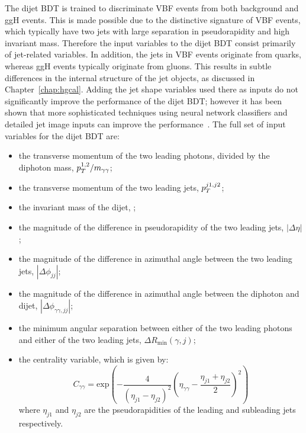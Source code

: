 The dijet BDT is trained to discriminate VBF events from both background and ggH events.
This is made possible due to the distinctive signature of VBF events, 
which typically have two jets with large separation in pseudorapidity and high invariant mass.
Therefore the input variables to the dijet BDT consist primarily of jet-related variables.
In addition, the jets in VBF events originate from quarks, 
whereas ggH events typically originate from gluons.
This results in subtle differences in the internal structure of the jet objects, 
as discussed in Chapter~\ref{chap:hgcal}.
Adding the jet shape variables used there as inputs 
do not significantly improve the performance of the dijet BDT;
however it has been shown that more sophisticated techniques using neural network classifiers
and detailed jet image inputs can improve the performance~\cite{JackThesis}.
The full set of input variables for the dijet BDT are:
\begin{itemize}
\item the transverse momentum of the two leading photons, divided by the diphoton mass, $p_T^{1,2}/m_{\gamma\gamma}$;
\item the transverse momentum of the two leading jets, $p_T^{j1,j2}$;
\item the invariant mass of the dijet, \mjj;
\item the magnitude of the difference in pseudorapidity of the two leading jets, $|\Delta\eta|$;
\item the magnitude of the difference in azimuthal angle 
      between the two leading jets, $|\Delta\phi_{jj}|$;
\item the magnitude of the difference in azimuthal angle 
      between the diphoton and dijet, $|\Delta\phi_{\gamma\gamma,jj}|$;
\item the minimum angular separation between either of the two leading photons 
      and either of the two leading jets, $\Delta R_{\textrm{min}}(\gamma,j)$;
\item the centrality variable, which is given by:
\begin{equation}
C_{\gamma\gamma} = \mathrm{exp}\left(-\frac{4}{(\eta_{j1} - \eta_{j2})^{2}}\left( \eta_{\gamma\gamma} - \frac{\eta_{j1} + \eta_{j2}}{2} \right)^{2}\right)
\end{equation}
where $\eta_{j1}$ and $\eta_{j2}$ are the pseudorapidities of the 
leading and subleading jets respectively.
\end{itemize}

